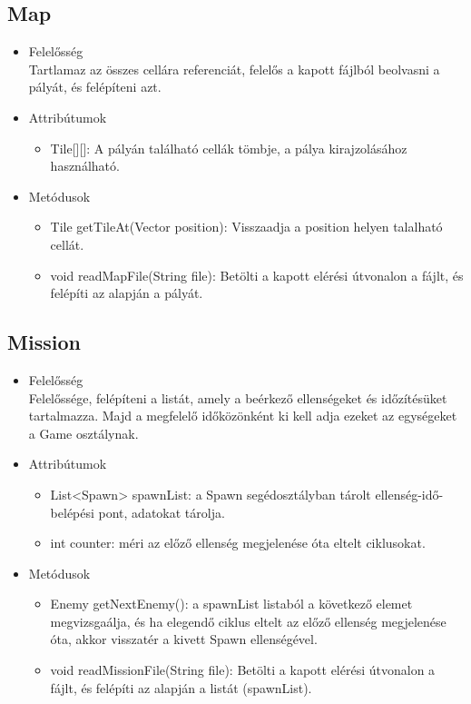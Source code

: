 \subsection{Map}
\begin{itemize}
\item Felelősség\\
Tartlamaz az összes cellára referenciát, felelős a kapott fájlból beolvasni a pályát, és felépíteni azt.
\item Attribútumok\\
	\begin{itemize}
		\item Tile[][]: A pályán található cellák tömbje, a pálya kirajzolásához használható.
	\end{itemize}
\item Metódusok\\
	\begin{itemize}
		\item Tile getTileAt(Vector position): Visszaadja a position helyen talalható cellát.
		\item void readMapFile(String file): Betölti a kapott elérési útvonalon a fájlt, és felépíti az alapján a pályát.
	\end{itemize}
\end{itemize}


\subsection{Mission}
\begin{itemize}
\item Felelősség\\
Felelőssége, felépíteni a listát, amely a beérkező ellenségeket és időzítésüket tartalmazza. Majd a megfelelő időközönként ki kell adja ezeket az egységeket a Game osztálynak.
\item Attribútumok\\
	\begin{itemize}
		\item List<Spawn> spawnList: a Spawn segédosztályban tárolt ellenség-idő-belépési pont, adatokat tárolja.
		\item int counter: méri az előző ellenség megjelenése óta eltelt ciklusokat.
	\end{itemize}
\item Metódusok\\
	\begin{itemize}
		\item Enemy getNextEnemy(): a spawnList listaból a következő elemet megvizsgaálja, és ha elegendő ciklus eltelt az előző ellenség megjelenése óta, akkor visszatér a kivett Spawn ellenségével.
		\item void readMissionFile(String file): Betölti a kapott elérési útvonalon a fájlt, és felépíti az alapján a listát (spawnList).
	\end{itemize}
\end{itemize}



